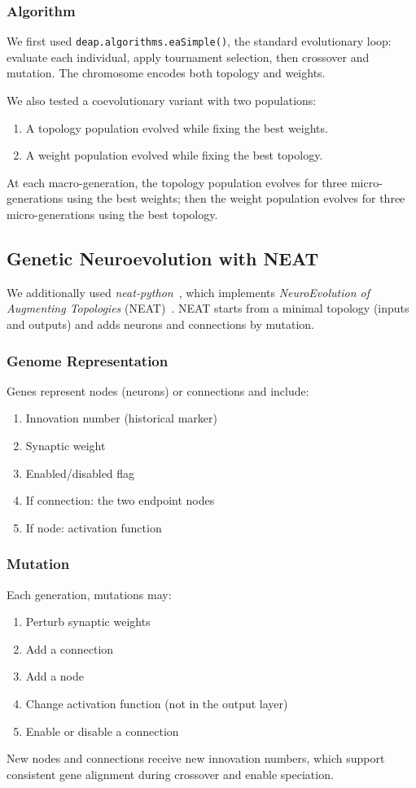 \documentclass[12pt]{article}
\theoremstyle{definition}
\begin{document}
\subsubsection{Algorithm}
We first used \texttt{deap.algorithms.eaSimple()}, the standard evolutionary loop: evaluate each individual, apply tournament selection, then crossover and mutation. The chromosome encodes both topology and weights.

We also tested a coevolutionary variant with two populations:
\begin{enumerate}
    \item A topology population evolved while fixing the best weights.
    \item A weight population evolved while fixing the best topology.
\end{enumerate}
At each macro-generation, the topology population evolves for three micro-generations using the best weights; then the weight population evolves for three micro-generations using the best topology.

\subsection{Genetic Neuroevolution with NEAT}
We additionally used \textit{neat-python}~\cite{McIntyre_neat-python}, which implements \textit{NeuroEvolution of Augmenting Topologies} (NEAT)~\cite{neat_original}. NEAT starts from a minimal topology (inputs and outputs) and adds neurons and connections by mutation.

\subsubsection{Genome Representation}
Genes represent nodes (neurons) or connections and include:
\begin{enumerate}
    \item Innovation number (historical marker)
    \item Synaptic weight
    \item Enabled/disabled flag
    \item If connection: the two endpoint nodes
    \item If node: activation function
\end{enumerate}

\subsubsection{Mutation}
Each generation, mutations may:
\begin{enumerate}
    \item Perturb synaptic weights
    \item Add a connection
    \item Add a node
    \item Change activation function (not in the output layer)
    \item Enable or disable a connection
\end{enumerate}
New nodes and connections receive new innovation numbers, which support consistent gene alignment during crossover and enable speciation.
\end{document}

